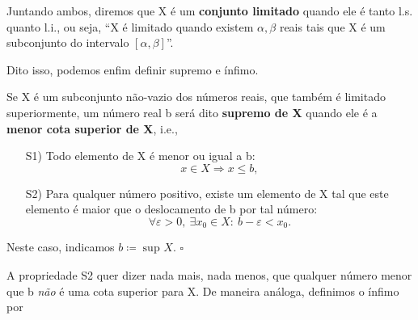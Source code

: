 \documentclass[../analysisII_notes.tex]{subfiles}
\begin{document}
Juntando ambos, diremos que X é um \textbf{conjunto limitado} quando ele é tanto l.s. quanto l.i., ou seja, ``X é limitado quando existem \(\alpha , \beta \) reais tais que X é um subconjunto do intervalo \([\alpha, \beta ]\)''.

Dito isso, podemos enfim definir supremo e ínfimo.
\begin{def*}
	Se X é um subconjunto não-vazio dos números reais, que também é limitado superiormente, um número real b será dito \textbf{supremo de X} quando ele é a \textbf{menor cota superior de X}, i.e.,
	\begin{itemize}
		\item[S1)] Todo elemento de X é menor ou igual a b:
		      \[
			      x\in X \Rightarrow x \leq b,
		      \]
		\item[S2)] Para qualquer número positivo, existe um elemento de X tal que este elemento é maior que o deslocamento de b por tal número:
		      \[
			      \forall \varepsilon > 0,\: \exists x_{0}\in X: \: b - \varepsilon < x_{0}.
		      \]
	\end{itemize}
	Neste caso, indicamos \(b\coloneqq \sup_{}X\). \(\square\)
\end{def*}
A propriedade S2 quer dizer nada mais, nada menos, que qualquer número menor que b \textit{não} é uma cota superior para X. De maneira análoga, definimos o ínfimo por
\end{document}
